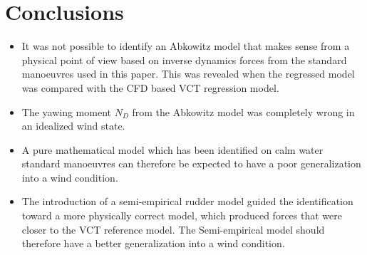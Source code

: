 \section{Conclusions}
\label{sec:conclusions}
\begin{itemize}
    \item It was not possible to identify an Abkowitz model that makes sense from a physical point of view based on inverse dynamics forces from the standard manoeuvres used in this paper. This was revealed when the regressed model was compared with the CFD based VCT regression model.
    \item The yawing moment $N_D$ from the Abkowitz model was completely wrong in an idealized wind state.
    \item A pure mathematical model which has been identified on calm water standard manoeuvres can therefore be expected to have a poor generalization into a wind condition.   
    \item The introduction of a semi-empirical rudder model guided the identification toward a more physically correct model, which produced forces that were closer to the VCT reference model. The Semi-empirical model should therefore have a better generalization into a wind condition.
\end{itemize}